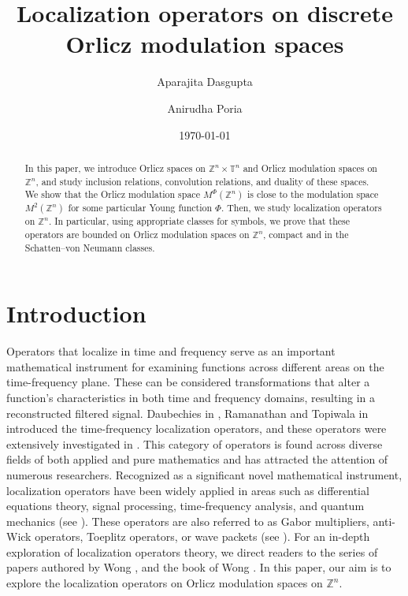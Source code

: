 \documentclass[a4paper,11pt, reqno]{amsart}
\title{Localization operators on discrete Orlicz modulation spaces}
\author{Aparajita Dasgupta}
\author{Anirudha Poria}
\date{\today}
\theoremstyle{plain}
\theoremstyle{definition}
\theoremstyle{remark}
\def \Z{{\mathbb Z}}
\begin{document}
\maketitle


\begin{abstract}
In this paper, we introduce Orlicz spaces on $ \mathbb Z^n \times \mathbb T^n $ and Orlicz modulation spaces on $\mathbb Z^n$, and study inclusion relations, convolution relations, and duality of these spaces. We show that the Orlicz modulation space $M^{\Phi}(\mathbb Z^n)$ is close to the modulation space $M^{2}(\mathbb Z^n)$ for some particular Young function $\Phi$. Then, we study localization operators on $\mathbb Z^n$. In particular, using appropriate classes for symbols, we prove that these operators are bounded on Orlicz modulation spaces on $\mathbb Z^n$, compact and in the Schatten--von Neumann classes.
\end{abstract}

\maketitle

\section{Introduction}  

Operators that localize in time and frequency serve as an important mathematical instrument for examining functions across different areas on the time-frequency plane. These can be considered transformations that alter a function’s characteristics in both time and frequency domains, resulting in a reconstructed filtered signal. Daubechies in \cite{dau88, dau90, pau88}, Ramanathan and Topiwala in \cite{ram93} introduced the time-frequency localization operators, and these operators were extensively investigated in \cite{fei02, won99, won02}. This category of operators is found across diverse fields of both applied and pure mathematics and has attracted the attention of numerous researchers. Recognized as a significant novel mathematical instrument, localization operators have been widely applied in areas such as differential equations theory, signal processing, time-frequency analysis, and quantum mechanics (see \cite{cor03, mar02, now02, gro01, ram93, won02}). These operators are also referred to as Gabor multipliers, anti-Wick operators, Toeplitz operators, or wave packets (see \cite{now02, ber71, cor78, fei02}). For an in-depth exploration of localization operators theory, we direct readers to the series of papers authored by Wong \cite{bog04, liu07, won2001, won2002, won2003}, and the book of Wong \cite{won02}. In this paper, our aim is to explore the localization operators on Orlicz modulation spaces on $\Z^n$.
\end{document}
